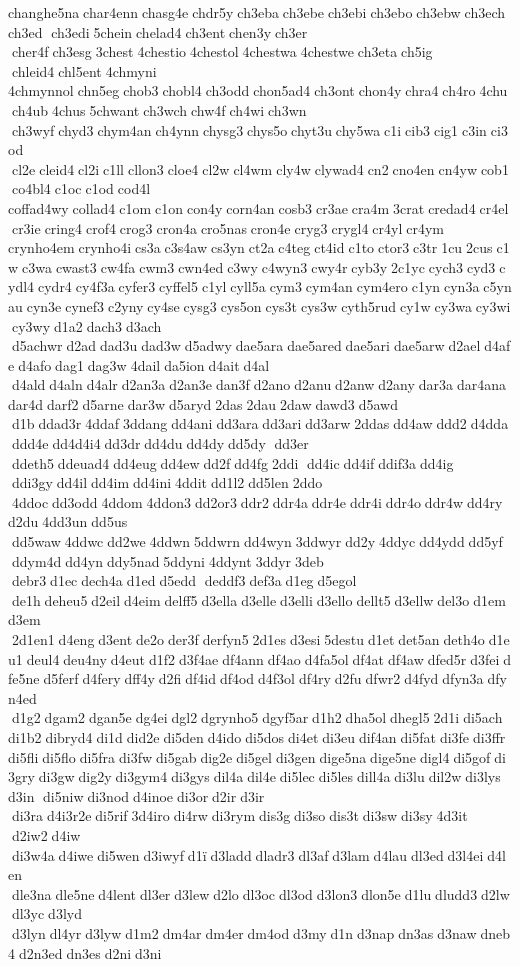 changhe5na char4enn chasg4e chdr5y ch3eba ch3ebe ch3ebi ch3ebo ch3ebw ch3ech ch3ed  ch3edi 5chein chelad4 ch3ent chen3y ch3er  cher4f ch3esg 3chest 4chestio 4chestol 4chestwa 4chestwe ch3eta ch5ig  chleid4 chl5ent 4chmyni 	4chmynnol chn5eg chob3 chobl4 ch3odd chon5ad4 ch3ont chon4y chra4 ch4ro 4chu  ch4ub 4chus 5chwant ch3wch chw4f ch4wi ch3wn  ch3wyf chyd3 chym4an ch4ynn chysg3 chys5o chyt3u chy5wa c1i cib3 cig1 c3in ci3od  cl2e cleid4 cl2i c1ll cllon3 cloe4 cl2w cl4wm cly4w clywad4 cn2 cno4en cn4yw cob1 co4bl4 c1oc c1od cod4l 	coffad4wy collad4 c1om c1on con4y corn4an cosb3 cr3ae cra4m 3crat credad4 cr4el cr3ie cring4 crof4 crog3 cron4a cro5nas cron4e cryg3 crygl4 cr4yl cr4ym 	crynho4em crynho4i cs3a c3s4aw cs3yn ct2a c4teg ct4id c1to ctor3 c3tr 1cu 2cus c1w c3wa cwast3 cw4fa cwm3 cwn4ed c3wy c4wyn3 cwy4r cyb3y 2c1yc cych3 cyd3 cydl4 cydr4 cy4f3a cyfer3 cyffel5 c1yl cyll5a cym3 cym4an cym4ero c1yn cyn3a c5ynau cyn3e cynef3 c2yny cy4se cysg3 cys5on cys3t cys3w cyth5rud cy1w cy3wa cy3wi cy3wy d1a2 dach3 d3ach  d5achwr d2ad dad3u dad3w d5adwy dae5ara dae5ared dae5ari dae5arw d2ael d4afe d4afo dag1 dag3w 4dail da5ion d4ait d4al  d4ald d4aln d4alr d2an3a d2an3e dan3f d2ano d2anu d2anw d2any dar3a dar4ana dar4d darf2 d5arne dar3w d5aryd 2das 2dau 2daw dawd3 d5awd  d1b ddad3r 4ddaf 3ddang dd4ani dd3ara dd3ari dd3arw 2ddas dd4aw ddd2 d4dda ddd4e dd4d4i4 dd3dr dd4du dd4dy dd5dy  dd3er  ddeth5 ddeuad4 dd4eug dd4ew dd2f dd4fg 2ddi  dd4ic dd4if ddif3a dd4ig  ddi3gy dd4il dd4im dd4ini 4ddit dd1l2 dd5len 2ddo  4ddoc dd3odd 4ddom 4ddon3 dd2or3 ddr2 ddr4a ddr4e ddr4i ddr4o ddr4w dd4ry d2du 4dd3un dd5us  dd5waw 4ddwc dd2we 4ddwn 5ddwrn dd4wyn 3ddwyr dd2y 4ddyc dd4ydd dd5yf  ddym4d dd4yn ddy5nad 5ddyni 4ddynt 3ddyr 3deb  debr3 d1ec dech4a d1ed d5edd  deddf3 def3a d1eg d5egol  de1h deheu5 d2eil d4eim delff5 d3ella d3elle d3elli d3ello dellt5 d3ellw del3o d1em d3em  2d1en1 d4eng d3ent de2o der3f derfyn5 2d1es d3esi 5destu d1et det5an deth4o d1eu1 deul4 deu4ny d4eut d1f2 d3f4ae df4ann df4ao d4fa5ol df4at df4aw dfed5r d3fei dfe5ne d5ferf d4fery dff4y d2fi df4id df4od d4f3ol df4ry d2fu dfwr2 d4fyd dfyn3a dfyn4ed  d1g2 dgam2 dgan5e dg4ei dgl2 dgrynho5 dgyf5ar d1h2 dha5ol dhegl5 2d1i di5ach di1b2 dibryd4 di1d did2e di5den d4ido di5dos di4et di3eu dif4an di5fat di3fe di3ffr di5fli di5flo di5fra di3fw di5gab dig2e di5gel di3gen dige5na dige5ne digl4 di5gof di3gry di3gw dig2y di3gym4 di3gys dil4a dil4e di5lec di5les dill4a di3lu dil2w di3lys d3in  di5niw di3nod d4inoe di3or d2ir d3ir  di3ra d4i3r2e di5rif 3d4iro di4rw di3rym dis3g di3so dis3t di3sw di3sy 4d3it  d2iw2 d4iw  di3w4a d4iwe di5wen d3iwyf d1ï d3ladd dladr3 dl3af d3lam d4lau dl3ed d3l4ei d4len  dle3na dle5ne d4lent dl3er d3lew d2lo dl3oc dl3od d3lon3 dlon5e d1lu dludd3 d2lw dl3yc d3lyd  d3lyn dl4yr d3lyw d1m2 dm4ar dm4er dm4od d3my d1n d3nap dn3as d3naw dneb4 d2n3ed dn3es d2ni d3ni 